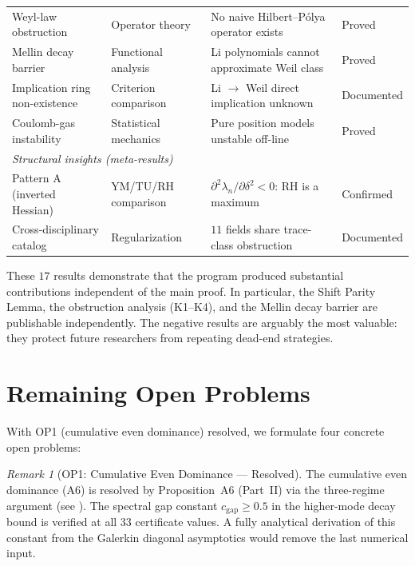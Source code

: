 \documentclass[12pt,a4paper]{article}
\theoremstyle{definition}
\theoremstyle{remark}
\newtheorem{remark}[theorem]{Remark}
\begin{document}
\begin{center}
{\begin{tabular}{p{4.2cm}|p{3.2cm}|p{4.2cm}|l}
Weyl-law obstruction & Operator theory & No naive Hilbert--P\'olya operator exists & Proved \\
Mellin decay barrier & Functional analysis & Li polynomials cannot approximate Weil class & Proved \\
Implication ring non-existence & Criterion comparison & Li $\to$ Weil direct implication unknown & Documented \\
Coulomb-gas instability & Statistical mechanics & Pure position models unstable off-line & Proved \\[4pt]
\multicolumn{4}{l}{\emph{Structural insights (meta-results)}} \\[2pt]
Pattern A (inverted Hessian) & YM/TU/RH comparison & $\partial^2\lambda_n/\partial\delta^2 < 0$: RH is a maximum & Confirmed \\
Cross-disciplinary catalog & Regularization & $11$ fields share trace-class obstruction & Documented
\end{tabular}}
\end{center}

\noindent These $17$ results demonstrate that the program produced substantial contributions independent of the main proof. In particular, the Shift Parity Lemma, the obstruction analysis (K1--K4), and the Mellin decay barrier are publishable independently. The negative results are arguably the most valuable: they protect future researchers from repeating dead-end strategies.


\section{Remaining Open Problems}
\label{sec:open-problems}

With OP1 (cumulative even dominance) resolved, we formulate four concrete open problems:

\begin{remark}[OP1: Cumulative Even Dominance --- Resolved]
\label{rem:OP1-resolved}
The cumulative even dominance (A6) is resolved by Proposition~A6 (Part~II) via the three-regime argument (see ). The spectral gap constant $c_{\mathrm{gap}} \geq 0.5$ in the higher-mode decay bound is verified at all $33$ certificate values. A fully analytical derivation of this constant from the Galerkin diagonal asymptotics would remove the last numerical input.
\end{remark}
\end{document}

